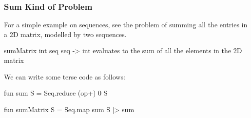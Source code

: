 \documentclass[aspectratio=169]{beamer}
\begin{document}

\begin{frame}[fragile]
  \frametitle{Sum Kind of Problem}

  For a simple example on sequences, see the problem of summing all
  the entries in a 2D matrix, modelled by two sequences.

  \pause
  \vspace{\fill}

  \spec
    {sumMatrix}
    {int seq seq -> int}
    {}
    { evaluates to the sum of all the elements in
    the 2D matrix }

  \pause
  \vspace{\fill}

  We can write some terse code as follows:

  \begin{codeblock}
    fun sum S = Seq.reduce (op+) 0 S

    fun sumMatrix S =
      Seq.map sum S
      |> sum
  \end{codeblock}
\end{frame}
\end{document}
